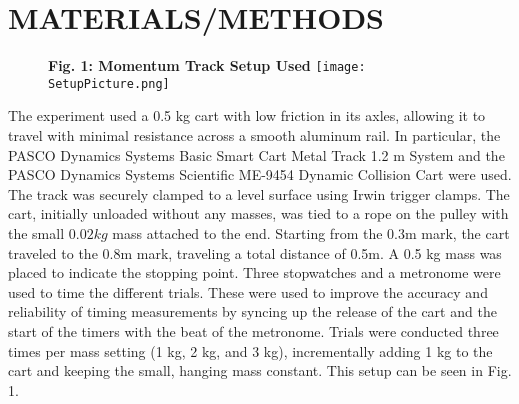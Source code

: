 \documentclass[twocolumn, 10pt]{article}
\begin{document}

 \section*{MATERIALS/METHODS}
 \begin{figure}[h]
    \centering
    \textbf{Fig. 1: Momentum Track Setup Used}
    \texttt{[image: SetupPicture.png]}
\end{figure}
\hspace{\parindent}The experiment used a 0.5 kg cart with low friction in its axles, allowing it to travel with minimal resistance across a smooth aluminum rail. In particular, the PASCO Dynamics Systems Basic Smart Cart Metal Track 1.2 m System and the PASCO Dynamics Systems Scientific ME-9454 Dynamic Collision Cart were used. The track was securely clamped to a level surface using Irwin trigger clamps. The cart, initially unloaded without any masses, was tied to a rope on the pulley with the small $0.02kg$ mass attached to the end. Starting from the 0.3m mark, the cart traveled to the 0.8m mark, traveling a total distance of 0.5m. A 0.5 kg mass was placed to indicate the stopping point. Three stopwatches and a metronome were used to time the different trials. These were used to improve the accuracy and reliability of timing measurements by syncing up the release of the cart and the start of the timers with the beat of the metronome. Trials were conducted three times per mass setting (1 kg, 2 kg, and 3 kg), incrementally adding 1 kg to the cart and keeping the small, hanging mass constant. This setup can be seen in Fig. 1.
\end{document}
